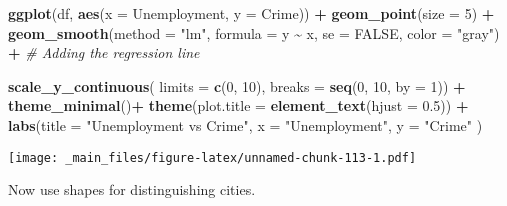 \documentclass[
]{book}
\newenvironment{Shaded}{\begin{snugshade}}{\end{snugshade}}
\newcommand{\AttributeTok}[1]{\textcolor[rgb]{0.13,0.29,0.53}{#1}}
\newcommand{\CommentTok}[1]{\textcolor[rgb]{0.56,0.35,0.01}{\textit{#1}}}
\newcommand{\ConstantTok}[1]{\textcolor[rgb]{0.56,0.35,0.01}{#1}}
\newcommand{\DecValTok}[1]{\textcolor[rgb]{0.00,0.00,0.81}{#1}}
\newcommand{\FloatTok}[1]{\textcolor[rgb]{0.00,0.00,0.81}{#1}}
\newcommand{\FunctionTok}[1]{\textcolor[rgb]{0.13,0.29,0.53}{\textbf{#1}}}
\newcommand{\NormalTok}[1]{#1}
\newcommand{\SpecialCharTok}[1]{\textcolor[rgb]{0.81,0.36,0.00}{\textbf{#1}}}
\newcommand{\StringTok}[1]{\textcolor[rgb]{0.31,0.60,0.02}{#1}}
\begin{document}
\begin{Shaded}
\begin{Highlighting}[]
\FunctionTok{ggplot}\NormalTok{(df, }\FunctionTok{aes}\NormalTok{(}\AttributeTok{x =}\NormalTok{ Unemployment, }\AttributeTok{y =}\NormalTok{ Crime)) }\SpecialCharTok{+}
  \FunctionTok{geom\_point}\NormalTok{(}\AttributeTok{size =} \DecValTok{5}\NormalTok{) }\SpecialCharTok{+}
  \FunctionTok{geom\_smooth}\NormalTok{(}\AttributeTok{method =} \StringTok{"lm"}\NormalTok{, }\AttributeTok{formula =}\NormalTok{ y }\SpecialCharTok{\textasciitilde{}}\NormalTok{ x, }\AttributeTok{se =} \ConstantTok{FALSE}\NormalTok{, }\AttributeTok{color =} \StringTok{"gray"}\NormalTok{) }\SpecialCharTok{+}  \CommentTok{\# Adding the regression line}

  \FunctionTok{scale\_y\_continuous}\NormalTok{(}
    \AttributeTok{limits =} \FunctionTok{c}\NormalTok{(}\DecValTok{0}\NormalTok{, }\DecValTok{10}\NormalTok{),}
    \AttributeTok{breaks =} \FunctionTok{seq}\NormalTok{(}\DecValTok{0}\NormalTok{, }\DecValTok{10}\NormalTok{, }\AttributeTok{by =} \DecValTok{1}\NormalTok{)) }\SpecialCharTok{+}
  \FunctionTok{theme\_minimal}\NormalTok{()}\SpecialCharTok{+}
  \FunctionTok{theme}\NormalTok{(}\AttributeTok{plot.title =} \FunctionTok{element\_text}\NormalTok{(}\AttributeTok{hjust =} \FloatTok{0.5}\NormalTok{)) }\SpecialCharTok{+}
  \FunctionTok{labs}\NormalTok{(}\AttributeTok{title =} \StringTok{"Unemployment vs Crime"}\NormalTok{,}
       \AttributeTok{x =} \StringTok{"Unemployment"}\NormalTok{,}
       \AttributeTok{y =} \StringTok{"Crime"}
\NormalTok{       )}
\end{Highlighting}
\end{Shaded}

\texttt{[image: \_main\_files/figure-latex/unnamed-chunk-113-1.pdf]}

Now use shapes for distinguishing cities.
\end{document}
